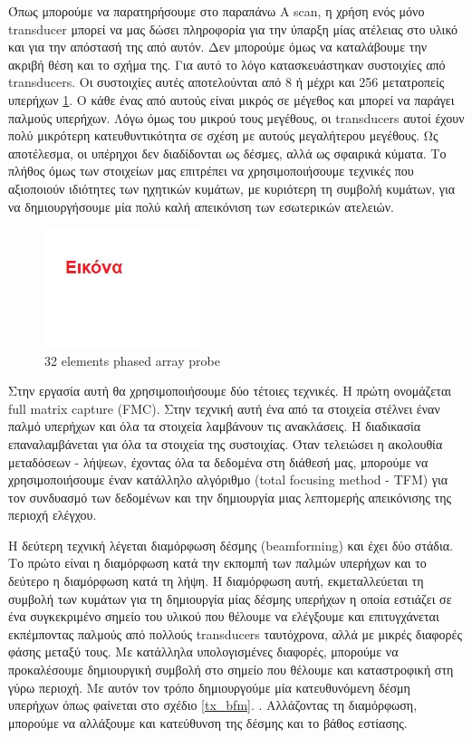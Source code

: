 \documentclass[12pt,a4paper]{book}
\begin{document}
Όπως μπορούμε να παρατηρήσουμε στο παραπάνω A scan, η χρήση ενός μόνο transducer μπορεί να μας δώσει πληροφορία για την ύπαρξη μίας ατέλειας στο υλικό και για την απόστασή της από αυτόν. Δεν μπορούμε όμως να καταλάβουμε την ακριβή θέση και το σχήμα της. Για αυτό το λόγο κατασκευάστηκαν συστοιχίες από transducers. Οι συστοιχίες αυτές αποτελούνται από 8 ή μέχρι και 256 μετατροπείς υπερήχων \ref{32el_PA}. Ο κάθε ένας από αυτούς είναι μικρός σε μέγεθος και μπορεί να παράγει παλμούς υπερήχων. Λόγω όμως του μικρού τους μεγέθους, οι transducers αυτοί έχουν πολύ μικρότερη κατευθυντικότητα σε σχέση με αυτούς μεγαλήτερου μεγέθους. Ως αποτέλεσμα, οι υπέρηχοι δεν διαδίδονται ως δέσμες, αλλά ως σφαιρικά κύματα. Το πλήθος όμως των στοιχείων μας επιτρέπει να χρησιμοποιήσουμε τεχνικές που αξιοποιούν ιδιότητες των ηχητικών κυμάτων, με κυριότερη τη συμβολή κυμάτων, για να δημιουργήσουμε μία πολύ καλή απεικόνιση των εσωτερικών ατελειών.

\begin{figure}
	\centering
	\includegraphics[width=0.4\textwidth]{myimage}
	\caption{32 elements phased array probe}
	\label{32el_PA}
\end{figure}

Στην εργασία αυτή θα χρησιμοποιήσουμε δύο τέτοιες τεχνικές. Η πρώτη ονομάζεται full matrix capture (FMC). Στην τεχνική αυτή ένα από τα στοιχεία στέλνει έναν παλμό υπερήχων και όλα τα στοιχεία λαμβάνουν τις ανακλάσεις. Η διαδικασία επαναλαμβάνεται για όλα τα στοιχεία της συστοιχίας. Όταν τελειώσει η ακολουθία μεταδόσεων - λήψεων, έχοντας όλα τα δεδομένα στη διάθεσή μας, μπορούμε να χρησιμοποιήσουμε έναν κατάλληλο αλγόριθμο (total focusing method - TFM) για τον συνδυασμό των δεδομένων και την δημιουργία μιας λεπτομερής απεικόνισης της περιοχή ελέγχου.

Η δεύτερη τεχνική λέγεται διαμόρφωση δέσμης (beamforming) και έχει δύο στάδια. Το πρώτο είναι η διαμόρφωση κατά την εκπομπή των παλμών υπερήχων και το δεύτερο η διαμόρφωση κατά τη λήψη. Η διαμόρφωση αυτή, εκμεταλλεύεται τη συμβολή των κυμάτων για τη δημιουργία μίας δέσμης υπερήχων η οποία εστιάζει σε ένα συγκεκριμένο σημείο του υλικού που θέλουμε να ελέγξουμε και επιτυγχάνεται εκπέμποντας παλμούς από πολλούς transducers ταυτόχρονα, αλλά με μικρές διαφορές φάσης μεταξύ τους. Με κατάλληλα υπολογισμένες διαφορές, μπορούμε να προκαλέσουμε δημιουργική συμβολή στο σημείο που θέλουμε και καταστροφική στη γύρω περιοχή. Με αυτόν τον τρόπο δημιουργούμε μία κατευθυνόμενη δέσμη υπερήχων όπως φαίνεται στο σχέδιο \ref{tx_bfm}. . Αλλάζοντας τη διαμόρφωση, μπορούμε να αλλάξουμε και κατεύθυνση της δέσμης και το βάθος εστίασης. 
\end{document}
